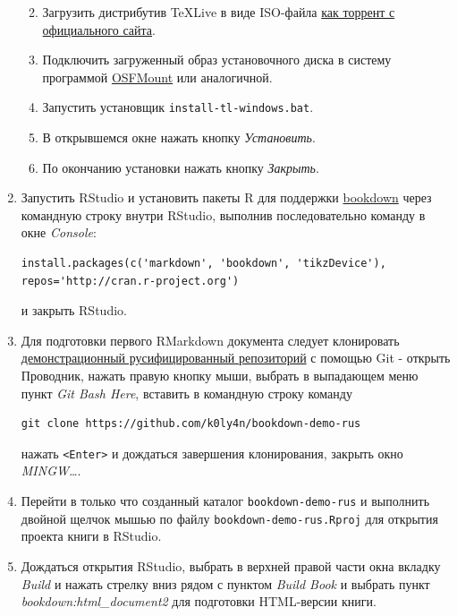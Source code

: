 \documentclass[
  a4paper,
]{book}
\providecommand{\tightlist}{%
  \setlength{\itemsep}{0pt}\setlength{\parskip}{0pt}}
\theoremstyle{definition}
\theoremstyle{definition}
\theoremstyle{definition}
\theoremstyle{definition}
\theoremstyle{remark}
\begin{document}
\begin{enumerate}
  \begin{enumerate}
  \def\labelenumii{\arabic{enumii}.}
  \tightlist
  \item
    Загрузить дистрибутив TeXLive в виде ISO-файла \href{https://www.tug.org/texlive/acquire-iso.html\#torrent}{как торрент с официального сайта}.
  \item
    Подключить загруженный образ установочного диска в систему программой \href{https://www.osforensics.com/tools/mount-disk-images.html}{OSFMount} или аналогичной.
  \item
    Запустить установщик \texttt{install-tl-windows.bat}.
  \item
    В открывшемся окне нажать кнопку \emph{Установить}.
  \item
    По окончанию установки нажать кнопку \emph{Закрыть}.
  \end{enumerate}
\item
  Запустить RStudio и установить пакеты R для поддержки \href{https://bookdown.org/home/getting-started.html}{bookdown} через командную строку внутри RStudio, выполнив последовательно команду в окне \emph{Console}:

\begin{verbatim}
install.packages(c('markdown', 'bookdown', 'tikzDevice'), repos='http://cran.r-project.org')
\end{verbatim}

  и закрыть RStudio.
\item
  Для подготовки первого RMarkdown документа следует клонировать \href{https://github.com/k0ly4n/bookdown-demo-rus}{демонстрационный русифицированный репозиторий} с помощью Git - открыть Проводник, нажать правую кнопку мыши, выбрать в выпадающем меню пункт \emph{Git Bash Here}, вставить в командную строку команду

\begin{verbatim}
git clone https://github.com/k0ly4n/bookdown-demo-rus
\end{verbatim}

  нажать \texttt{\textless{}Enter\textgreater{}} и дождаться завершения клонирования, закрыть окно \emph{MINGW\ldots{}}.
\item
  Перейти в только что созданный каталог \texttt{bookdown-demo-rus} и выполнить двойной щелчок мышью по файлу \texttt{bookdown-demo-rus.Rproj} для открытия проекта книги в RStudio.
\item
  Дождаться открытия RStudio, выбрать в верхней правой части окна вкладку \emph{Build} и нажать стрелку вниз рядом с пунктом \emph{Build Book} и выбрать пункт \emph{bookdown:html\_document2} для подготовки HTML-версии книги.


\end{enumerate}
\end{document}
